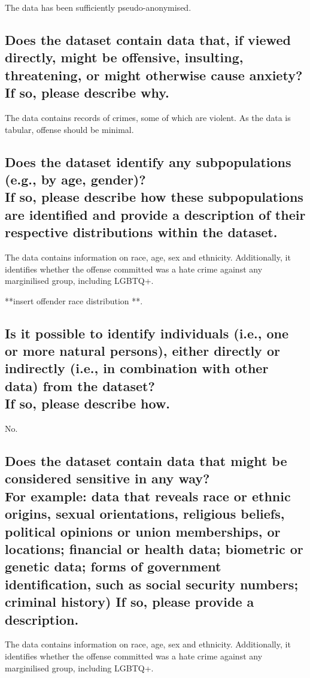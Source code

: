 \documentclass[letterpaper, 10 pt, conference]{ieeeconf}  %
\newcommand{\subtitle}[1]{{\\ \small \normalfont \color{purple} #1}}
\begin{document}
The data has been sufficiently pseudo-anonymised. 

\subsection{Does the dataset contain data that, if viewed directly, might be offensive, insulting, threatening, or might otherwise cause anxiety? \subtitle{If so, please describe why.}}

The data contains records of crimes, some of which are violent. As the data is tabular, offense should be minimal.

\subsection{Does the dataset identify any subpopulations (e.g., by age, gender)? \subtitle{If so, please describe how these subpopulations are identified and provide a description of their respective distributions within the dataset.}}

The data contains information on race, age, sex and ethnicity. Additionally, it identifies whether the offense committed was a hate crime against any marginilised group, including LGBTQ+.

**insert offender race distribution **.

\subsection{Is it possible to identify individuals (i.e., one or more natural persons), either directly or indirectly (i.e., in combination with other data) from the dataset? \subtitle{If so, please describe how.}}

No.

\subsection{Does the dataset contain data that might be considered sensitive in any way? \subtitle{For example: data that reveals race or ethnic origins, sexual orientations, religious beliefs, political opinions or union memberships, or locations; financial or health data; biometric or genetic data; forms of government identification, such as social security numbers; criminal history) If so, please provide a description.}}

The data contains information on race, age, sex and ethnicity. Additionally, it identifies whether the offense committed was a hate crime against any marginilised group, including LGBTQ+.
\end{document}
